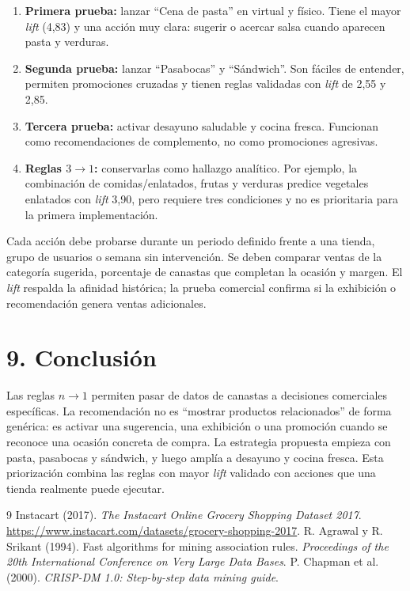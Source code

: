 \documentclass[10pt,letterpaper]{article}
\begin{document}
\begin{enumerate}
    \item \textbf{Primera prueba:} lanzar ``Cena de pasta'' en virtual y físico. Tiene el mayor \textit{lift} (4,83) y una acción muy clara: sugerir o acercar salsa cuando aparecen pasta y verduras.
    \item \textbf{Segunda prueba:} lanzar ``Pasabocas'' y ``Sándwich''. Son fáciles de entender, permiten promociones cruzadas y tienen reglas validadas con \textit{lift} de 2,55 y 2,85.
    \item \textbf{Tercera prueba:} activar desayuno saludable y cocina fresca. Funcionan como recomendaciones de complemento, no como promociones agresivas.
    \item \textbf{Reglas $3\rightarrow1$:} conservarlas como hallazgo analítico. Por ejemplo, la combinación de comidas/enlatados, frutas y verduras predice vegetales enlatados con \textit{lift} 3,90, pero requiere tres condiciones y no es prioritaria para la primera implementación.
\end{enumerate}

Cada acción debe probarse durante un periodo definido frente a una tienda, grupo de usuarios o semana sin intervención. Se deben comparar ventas de la categoría sugerida, porcentaje de canastas que completan la ocasión y margen. El \textit{lift} respalda la afinidad histórica; la prueba comercial confirma si la exhibición o recomendación genera ventas adicionales.

\section*{9. Conclusión}

Las reglas $n\rightarrow1$ permiten pasar de datos de canastas a decisiones comerciales específicas. La recomendación no es ``mostrar productos relacionados'' de forma genérica: es activar una sugerencia, una exhibición o una promoción cuando se reconoce una ocasión concreta de compra. La estrategia propuesta empieza con pasta, pasabocas y sándwich, y luego amplía a desayuno y cocina fresca. Esta priorización combina las reglas con mayor \textit{lift} validado con acciones que una tienda realmente puede ejecutar.

\vspace{0.25cm}
\begin{thebibliography}{9}
 Instacart (2017). \textit{The Instacart Online Grocery Shopping Dataset 2017}. \url{https://www.instacart.com/datasets/grocery-shopping-2017}.
 R. Agrawal y R. Srikant (1994). Fast algorithms for mining association rules. \textit{Proceedings of the 20th International Conference on Very Large Data Bases}.
 P. Chapman et al. (2000). \textit{CRISP-DM 1.0: Step-by-step data mining guide}.
\end{thebibliography}
\end{document}
